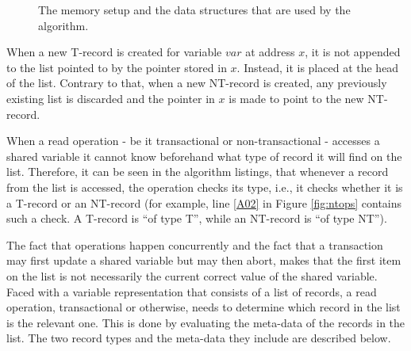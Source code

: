 \documentclass[11pt,letterpaper]{article}
\begin{document}
\begin{figure*}[h]
\centerline{
}
\caption{The memory setup and the data structures that are used by the 
algorithm.}
\label{fig:mem_setup}
\end{figure*}

When  a new  T-record is  created  for variable  $\mathit{var}$ at  address
$\mathit{x}$, it is not appended  
to the list  pointed to by the pointer stored  in $\mathit{x}$. Instead, it
is placed at the head of the list.  
Contrary to that, when a  new NT-record is created, any previously existing
list is discarded  and the pointer  in $\mathit{x}$ is made to point to the
new NT-record.  

When a read operation - be it transactional or non-transactional - accesses 
a shared variable it cannot know beforehand what type of record it will find 
on the list. Therefore, it can be seen in the algorithm listings, that whenever 
a record from the list is accessed, 
the operation checks its type, i.e., it checks 
whether it is a T-record or an NT-record (for example, line \ref{A02} in Figure 
\ref{fig:ntops} contains such a check. A T-record is {}``of type T'', while an 
NT-record is {}``of type NT''). 

The  fact  that  operations  happen   concurrently  and  the  fact  that  a
transaction may  first  update a shared variable but  may then abort, makes
that the first item on the  
list  is  not   necessarily  the  current  correct  value   of  the  shared
variable. Faced with a  variable  representation that consists of a list of
records, a read operation,  
transactional or otherwise, needs to determine which record in the list is the 
relevant one.  This is done by  evaluating the meta-data of  the records in
the  list.   The  two record  types  and  the  meta-data they  include  are
described below.  
\end{document}
